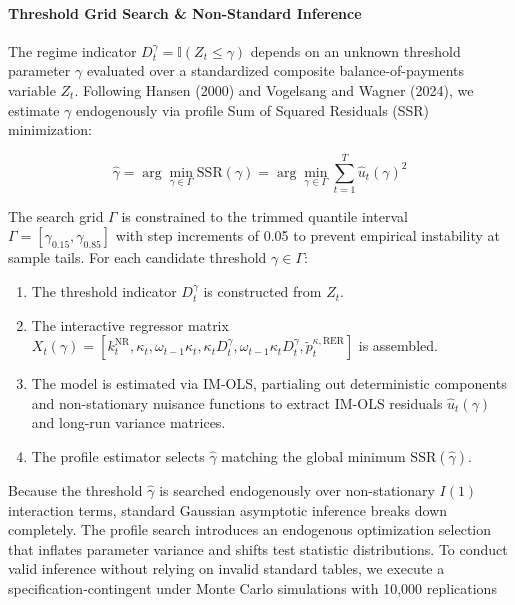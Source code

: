 


\paragraph{Threshold Grid Search \& Non-Standard Inference} The regime indicator $D_t^{\gamma} = \mathbb{I}(Z_t \le \gamma)$ depends on an unknown threshold parameter $\gamma$ evaluated over a standardized composite balance-of-payments variable $Z_t$. Following Hansen (2000) and Vogelsang and Wagner (2024), we estimate $\gamma$ endogenously via profile Sum of Squared Residuals (SSR) minimization:

\begin{equation}
	\hat{\gamma} = \arg\min_{\gamma \in \Gamma} \text{SSR}(\gamma) = \arg\min_{\gamma \in \Gamma} \sum_{t=1}^{T} \hat{u}_t(\gamma)^2
\end{equation}


The search grid $\Gamma$ is constrained to the trimmed quantile interval $\Gamma = [\gamma_{0.15}, \gamma_{0.85}]$ with step increments of 0.05 to prevent empirical instability at sample tails.
For each candidate threshold $\gamma \in \Gamma$:
\begin{enumerate}
	\item The threshold indicator $D_t^{\gamma}$ is constructed from $Z_t$.
	\item The interactive regressor matrix $X_t(\gamma) = [k_t^{\text{NR}}, \kappa_t, \omega_{t-1} \kappa_t, \kappa_t D_t^{\gamma}, \omega_{t-1} \kappa_t D_t^{\gamma}, \tilde{p}_t^{\kappa, \text{RER}}]$ is assembled.
	\item The model is estimated via IM-OLS, partialing out deterministic components and non-stationary nuisance functions to extract IM-OLS residuals $\hat{u}_t(\gamma)$ and long-run variance matrices.
	\item The profile estimator selects $\hat{\gamma}$ matching the global minimum $\text{SSR}(\hat{\gamma})$.
\end{enumerate}

Because the threshold $\hat{\gamma}$ is searched endogenously over non-stationary $I(1)$ interaction terms, standard Gaussian asymptotic inference breaks down completely. The profile search introduces an endogenous optimization selection that inflates parameter variance and shifts test statistic distributions. To conduct valid inference without relying on invalid standard tables, we execute a specification-contingent under Monte Carlo simulations with 10,000 replications

